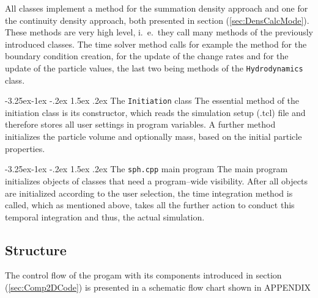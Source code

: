 \documentclass{report}
\makeatletter
\renewcommand\paragraph{\@startsection{paragraph}{4}{\z@}%
  {-3.25ex\@plus -1ex \@minus -.2ex}%
  {1.5ex \@plus .2ex}%
  {\normalfont\normalsize\bfseries}}
\makeatother
\begin{document}
All classes implement a method for the summation density approach and one for the continuity density approach, both presented in section (\ref{sec:DensCalcMode}).
These methods are very high level, i.\ e.\ they call many methods of the previously introduced classes. The time solver method calls for example the method for the boundary condition creation, for the update of the change rates and for the update of the particle values, the last two being methods of the {\tt Hydrodynamics} class.


\paragraph{The {\tt Initiation} class}
The essential method of the initiation class is its constructor, which reads the simulation setup (.tcl) file and therefore stores all user settings in program variables. A further method initializes the particle volume and optionally mass, based on the initial particle properties.

\paragraph{The {\tt sph.cpp} main program}
The main program initializes objects of classes that need a program--wide visibility. 
After all objects are initialized according to the user selection, the time integration method is called, which as mentioned above, takes all the further action to conduct this temporal integration and thus, the actual simulation. 




\subsection{Structure}
\label{sec:Struc2DCode}
The control flow of the progam with its components introduced in section (\ref{sec:Comp2DCode}) is presented in a schematic flow chart shown in APPENDIX
\end{document}
